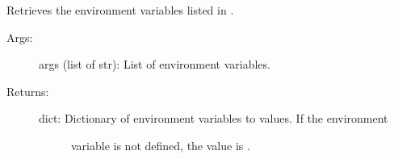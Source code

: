 \documentclass[letterpaper,10pt,english]{sphinxmanual}
\begin{document}
\begin{fulllineitems}

\begin{fulllineitems}
\label{\detokenize{api:nanostream.node.bcolors.OKGREEN}}\pysigline{\sphinxbfcode{\sphinxupquote{OKGREEN}}\sphinxbfcode{\sphinxupquote{ = '\textbackslash{}x1b{[}92m'}}}
\end{fulllineitems}


\begin{fulllineitems}
\label{\detokenize{api:nanostream.node.bcolors.UNDERLINE}}\pysigline{\sphinxbfcode{\sphinxupquote{UNDERLINE}}\sphinxbfcode{\sphinxupquote{ = '\textbackslash{}x1b{[}4m'}}}
\end{fulllineitems}


\begin{fulllineitems}
\label{\detokenize{api:nanostream.node.bcolors.WARNING}}\pysigline{\sphinxbfcode{\sphinxupquote{WARNING}}\sphinxbfcode{\sphinxupquote{ = '\textbackslash{}x1b{[}93m'}}}
\end{fulllineitems}


\end{fulllineitems}


\begin{fulllineitems}
\label{\detokenize{api:nanostream.node.class_factory}}
\end{fulllineitems}


\begin{fulllineitems}
\label{\detokenize{api:nanostream.node.get_environment_variables}}
Retrieves the environment variables listed in .
\begin{description}
\item[{Args:}] \leavevmode
args (list of str): List of environment variables.

\item[{Returns:}] \leavevmode\begin{description}
\item[{dict: Dictionary of environment variables to values. If the environment}] \leavevmode
variable is not defined, the value is .

\end{description}

\end{description}

\end{fulllineitems}
\end{document}
